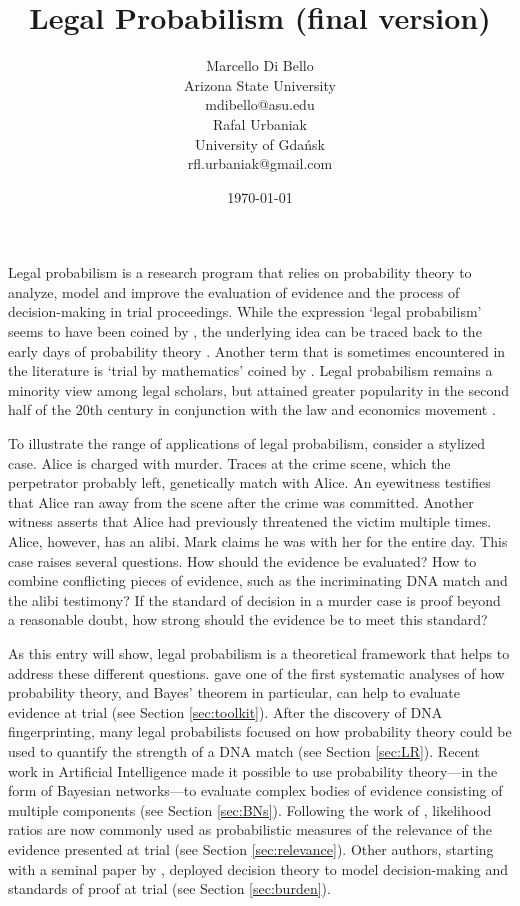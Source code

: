 \documentclass{article}
\title{Legal Probabilism (final version)}
\author{Marcello Di Bello\\Arizona State University\\  mdibello@asu.edu 
   \vspace{4mm} \\   
  Rafal Urbaniak\\ 
  University of Gda\' nsk \\
  rfl.urbaniak@gmail.com
  }
\date{\today}
\begin{document}
\maketitle


\thispagestyle{empty}
Legal probabilism is a research program that relies on probability theory to analyze, model and improve the evaluation of evidence and the process of decision-making in trial proceedings. While the expression `legal probabilism'  seems to have been coined by \citet{haack2011legal}, the underlying idea can be traced back to the early days of probability theory
\cite[see, for example,][]{Bernoulli1713Ars-conjectandi}. Another term that is sometimes encountered in the literature is `trial by mathematics' coined by \cite{tribe71}.   Legal probabilism remains a minority view among legal scholars, but attained greater popularity in the second half of the 20th century in conjunction with  
the law and economics movement \citep{Calabresi1961, becker1968crime, Posner1973}. 

 To illustrate the range of applications of legal probabilism, consider a  stylized case. Alice is charged
with murder. Traces at the crime scene, which the perpetrator probably left, genetically match with Alice. An eyewitness testifies that Alice ran away from the scene after  the crime was committed. Another witness asserts that Alice had previously threatened the victim  multiple times. Alice, however, has an alibi. Mark claims he was with her for the entire day. This case raises several questions. How should the evidence be evaluated?  How to combine conflicting pieces of evidence, such as the incriminating DNA match and the alibi testimony? 
 If the standard of decision in a murder case is proof beyond a reasonable doubt, how strong should the  evidence be to meet this standard? 

As this entry will show, legal probabilism is a theoretical framework that helps to address these different questions. 
\cite{Finkelstein1970A} gave one of the first systematic analyses of how probability theory, and Bayes' theorem in particular, can help to evaluate evidence at trial 
(see Section \ref{sec:toolkit}). 
After the discovery of DNA fingerprinting, many legal probabilists focused on how probability theory could be used to quantify the strength of a DNA match 
(see Section \ref{sec:LR}).
 Recent work in Artificial Intelligence made it possible to use probability theory---in the form of Bayesian networks---to evaluate complex bodies of evidence consisting of multiple components  (see Section  \ref{sec:BNs}). 
Following the work of \cite{lempert1977modeling},
 likelihood ratios are now commonly used as  probabilistic measures of the relevance of the evidence presented at trial (see Section \ref{sec:relevance}).
Other  authors, starting with a seminal paper by \cite{kaplan1968decision},  deployed decision theory   to model decision-making and standards of proof at trial  (see Section \ref{sec:burden}). %
\end{document}
